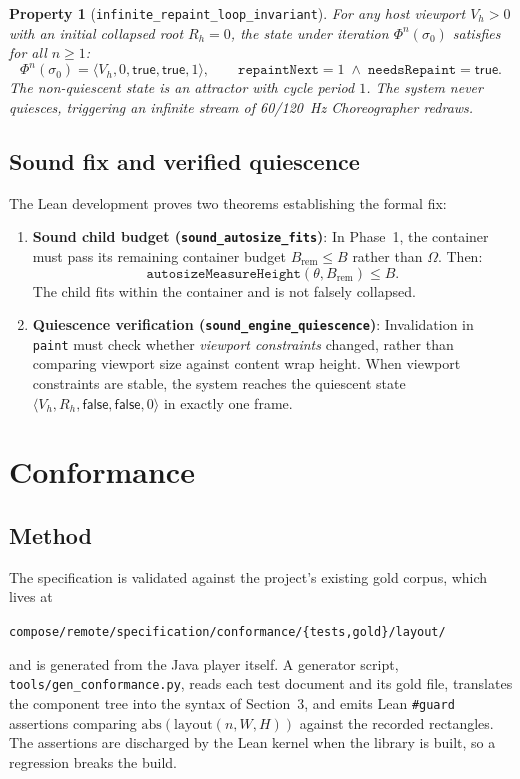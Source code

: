 \documentclass[11pt,a4paper]{article}
\newcommand{\Om}{\Omega}
\newcommand{\lo}[1]{\texttt{#1}}       %
\newcommand{\jv}[1]{\texttt{#1}}       %
\newcommand{\file}[1]{\texttt{#1}}
\theoremstyle{definition}
\theoremstyle{plain}
\newtheorem{property}{Property}[section]
\theoremstyle{remark}
\begin{document}
\begin{property}[\lo{infinite\_repaint\_loop\_invariant}]
For any host viewport $V_h > 0$ with an initial collapsed root $R_h = 0$, the state under iteration
$\Phi^n(\sigma_0)$ satisfies for all $n \ge 1$:
\[
  \Phi^n(\sigma_0) = \langle V_h, 0, \textsf{true}, \textsf{true}, 1 \rangle,
  \qquad \lo{repaintNext} = 1 \;\land\; \lo{needsRepaint} = \textsf{true}.
\]
The non-quiescent state is an attractor with cycle period $1$. The system never quiesces,
triggering an infinite stream of 60/120~Hz Choreographer redraws.
\end{property}

\subsection{Sound fix and verified quiescence}
\label{sec:autosize-fix}

The Lean development proves two theorems establishing the formal fix:
\begin{enumerate}
  \item \textbf{Sound child budget (\lo{sound\_autosize\_fits})}: In Phase~1, the container must pass
    its remaining container budget $B_{\mathrm{rem}} \le B$ rather than $\Om$. Then:
    \[
      \lo{autosizeMeasureHeight}(\theta, B_{\mathrm{rem}}) \le B.
    \]
    The child fits within the container and is not falsely collapsed.
  \item \textbf{Quiescence verification (\lo{sound\_engine\_quiescence})}: Invalidation in \jv{paint}
    must check whether \emph{viewport constraints} changed, rather than comparing viewport size against
    content wrap height. When viewport constraints are stable, the system reaches the quiescent state
    $\langle V_h, R_h, \textsf{false}, \textsf{false}, 0 \rangle$ in exactly one frame.
\end{enumerate}

\section{Conformance}

\label{sec:conformance}

\subsection{Method}

The specification is validated against the project's existing gold corpus,
which lives at
\begin{center}
\file{compose/remote/specification/conformance/\{tests,gold\}/layout/}
\end{center}
and is generated from the Java player itself. A generator script,
\file{tools/gen\_conformance.py}, reads each test document and its gold file,
translates the component tree into the syntax of Section~3, and emits Lean
\jv{\#guard} assertions comparing $\mathrm{abs}(\mathrm{layout}(n, W, H))$
against the recorded rectangles. The assertions are discharged by the Lean
kernel when the library is built, so a regression breaks the build.
\end{document}
